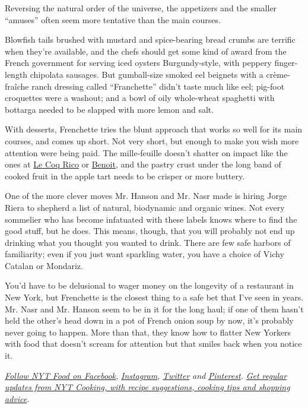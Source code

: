 Reversing the natural order of the universe, the appetizers and the
smaller ``amuses'' often seem more tentative than the main courses.

Blowfish tails brushed with mustard and spice-bearing bread crumbs are
terrific when they're available, and the chefs should get some kind of
award from the French government for serving iced oysters
Burgundy-style, with peppery finger-length chipolata sausages. But
gumball-size smoked eel beignets with a crème-fraîche ranch dressing
called ``Franchette'' didn't taste much like eel; pig-foot croquettes
were a washout; and a bowl of oily whole-wheat spaghetti with bottarga
needed to be slapped with more lemon and salt.

With desserts, Frenchette tries the blunt approach that works so well
for its main courses, and comes up short. Not very short, but enough to
make you wish more attention were being paid. The mille-feuille doesn't
shatter on impact like the ones at
\href{https://www.nytimes3xbfgragh.onion/2016/06/15/dining/le-coq-rico-review.html}{Le
Coq Rico} or
\href{https://www.nytimes3xbfgragh.onion/2016/02/03/dining/benoit-review.html}{Benoit},
and the pastry crust under the long band of cooked fruit in the apple
tart needs to be crisper or more buttery.

One of the more clever moves Mr. Hanson and Mr. Nasr made is hiring
Jorge Riera to shepherd a list of natural, biodynamic and organic wines.
Not every sommelier who has become infatuated with these labels knows
where to find the good stuff, but he does. This means, though, that you
will probably not end up drinking what you thought you wanted to drink.
There are few safe harbors of familiarity; even if you just want
sparkling water, you have a choice of Vichy Catalan or Mondariz.

You'd have to be delusional to wager money on the longevity of a
restaurant in New York, but Frenchette is the closest thing to a safe
bet that I've seen in years. Mr. Nasr and Mr. Hanson seem to be in it
for the long haul; if one of them hasn't held the other's head down in a
pot of French onion soup by now, it's probably never going to happen.
More than that, they know how to flatter New Yorkers with food that
doesn't scream for attention but that smiles back when you notice it.

\href{https://www.facebookcorewwwi.onion/nytfood/}{\emph{Follow NYT Food
on Facebook}}\emph{,}
\href{https://instagram.com/nytfood}{\emph{Instagram}}\emph{,}
\href{https://twitter.com/nytfood}{\emph{Twitter}} \emph{and}
\href{https://www.pinterest.com/nytfood/}{\emph{Pinterest}}\emph{.}
\href{https://www.nytimes3xbfgragh.onion/newsletters/cooking}{\emph{Get
regular updates from NYT Cooking, with recipe suggestions, cooking tips
and shopping advice}}\emph{.}

